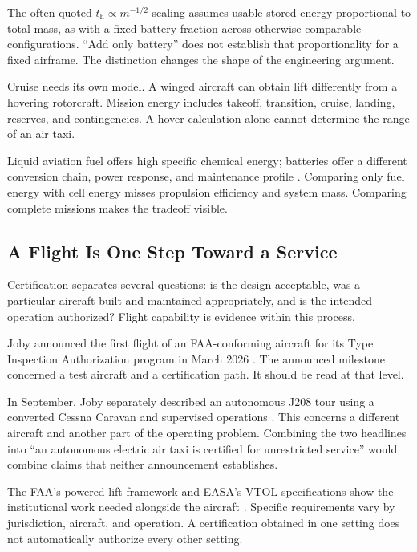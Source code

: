 \documentclass[11pt,openany]{book}
\begin{document}
The often-quoted $t_{\mathrm h}\propto m^{-1/2}$ scaling assumes usable stored energy proportional to total mass, as with a fixed battery fraction across otherwise comparable configurations. “Add only battery” does not establish that proportionality for a fixed airframe. The distinction changes the shape of the engineering argument.

Cruise needs its own model. A winged aircraft can obtain lift differently from a hovering rotorcraft. Mission energy includes takeoff, transition, cruise, landing, reserves, and contingencies. A hover calculation alone cannot determine the range of an air taxi.

Liquid aviation fuel offers high specific chemical energy; batteries offer a different conversion chain, power response, and maintenance profile \cite{viswanathan2022challenges}. Comparing only fuel energy with cell energy misses propulsion efficiency and system mass. Comparing complete missions makes the tradeoff visible.

\subsection{A Flight Is One Step Toward a Service}

Certification separates several questions: is the design acceptable, was a particular aircraft built and maintained appropriately, and is the intended operation authorized? Flight capability is evidence within this process.

Joby announced the first flight of an FAA-conforming aircraft for its Type Inspection Authorization program in March 2026 \cite{joby2026conforming}. The announced milestone concerned a test aircraft and a certification path. It should be read at that level.

In September, Joby separately described an autonomous J208 tour using a converted Cessna Caravan and supervised operations \cite{joby2026j208}. This concerns a different aircraft and another part of the operating problem. Combining the two headlines into “an autonomous electric air taxi is certified for unrestricted service” would combine claims that neither announcement establishes.

The FAA's powered-lift framework and EASA's VTOL specifications show the institutional work needed alongside the aircraft \cite{faa2026aam,easa2026vtol}. Specific requirements vary by jurisdiction, aircraft, and operation. A certification obtained in one setting does not automatically authorize every other setting.
\end{document}
